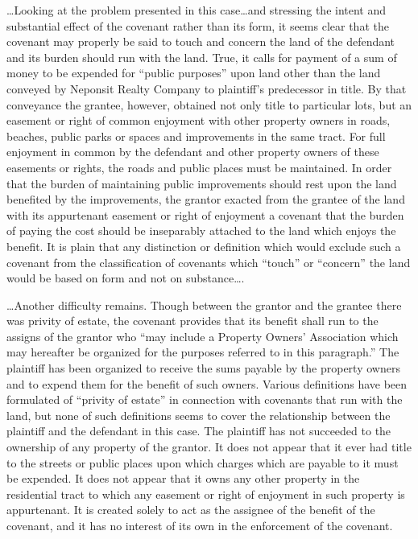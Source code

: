\ldots Looking at the problem presented in this case\ldots and stressing the
intent and substantial effect of the covenant rather than its form, it seems
clear that the covenant may properly be said to touch and concern the land of
the defendant and its burden should run with the land. True, it calls for
payment of a sum of money to be expended for ``public purposes'' upon land other
than the land conveyed by Neponsit Realty Company to plaintiff's predecessor in
title. By that conveyance the grantee, however, obtained not only title to
particular lots, but an easement or right of common enjoyment with other
property owners in roads, beaches, public parks or spaces and improvements in
the same tract. For full enjoyment in common by the defendant and other property
owners of these easements or rights, the roads and public places must be
maintained. In order that the burden of maintaining public improvements should
rest upon the land benefited by the improvements, the grantor exacted from the
grantee of the land with its appurtenant easement or right of enjoyment a
covenant that the burden of paying the cost should be inseparably attached to
the land which enjoys the benefit. It is plain that any distinction or
definition which would exclude such a covenant from the classification of
covenants which ``touch'' or ``concern'' the land would be based on form and not
on substance\ldots .

\ldots Another difficulty remains. Though between the grantor and the grantee
there was privity of estate, the covenant provides that its benefit shall run to
the assigns of the grantor who ``may include a Property Owners' Association
which may hereafter be organized for the purposes referred to in this
paragraph.'' The plaintiff has been organized to receive the sums payable by the
property owners and to expend them for the benefit of such owners. Various
definitions have been formulated of ``privity of estate'' in connection with
covenants that run with the land, but none of such definitions seems to cover
the relationship between the plaintiff and the defendant in this case. The
plaintiff has not succeeded to the ownership of any property of the grantor. It
does not appear that it ever had title to the streets or public places upon
which charges which are payable to it must be expended. It does not appear that
it owns any other property in the residential tract to which any easement or
right of enjoyment in such property is appurtenant. It is created solely to act
as the assignee of the benefit of the covenant, and it has no interest of its
own in the enforcement of the covenant.


